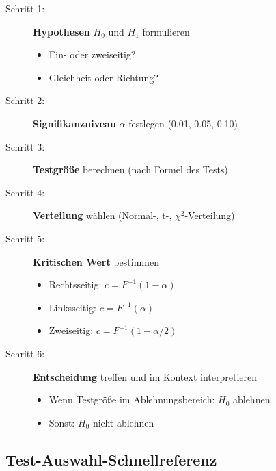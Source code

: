 \documentclass[10pt, a4paper, ngerman]{scrartcl}
\begin{document}
\begin{description}
  \item[Schritt 1:] {\bf Hypothesen} $H_0$ und $H_1$ formulieren
    \begin{itemize}
      \item[] Ein- oder zweiseitig?
      \item[] Gleichheit oder Richtung?
    \end{itemize}
  
  \item[Schritt 2:] {\bf Signifikanzniveau} $\alpha$ festlegen (0.01, 0.05, 0.10)
  
  \item[Schritt 3:] {\bf Testgröße} berechnen (nach Formel des Tests)
  
  \item[Schritt 4:] {\bf Verteilung} wählen (Normal-, t-, $\chi^2$-Verteilung)
  
  \item[Schritt 5:] {\bf Kritischen Wert} bestimmen
    \begin{itemize}
      \item[] Rechtsseitig: $c = F^{-1}(1-\alpha)$
      \item[] Linksseitig: $c = F^{-1}(\alpha)$
      \item[] Zweiseitig: $c = F^{-1}(1-\alpha/2)$
    \end{itemize}
  
  \item[Schritt 6:] {\bf Entscheidung} treffen und im Kontext interpretieren
    \begin{itemize}
      \item[] Wenn Testgröße im Ablehnungsbereich: $H_0$ ablehnen
      \item[] Sonst: $H_0$ nicht ablehnen
    \end{itemize}
\end{description}

\subsection{Test-Auswahl-Schnellreferenz}
\end{document}
